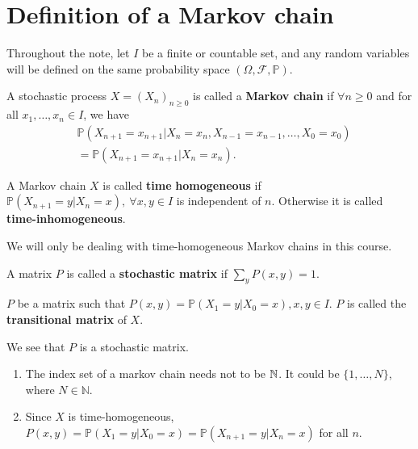 \documentclass[a4paper]{article}
\begin{document}
\maketitle
\clearpage
\tableofcontents
\clearpage 

\section{Definition of a Markov chain}
Throughout the note, let $ I $ be a finite or countable set, and any random variables will be defined on the same probability space $ (\Omega, \mathcal{F}, \mathbb{P}) $.

\begin{definition}
    A stochastic process $ X=(X_n)_{n\ge 0} $ is called a \textbf{Markov chain} if $ \forall n\ge 0 $ and for all $ x_1,\dots,x_n\in I $, we have 
    \[
        \begin{aligned}
            &\mathbb{P}(X_{n+1}=x_{n+1}|X_n=x_n, X_{n-1}=x_{n-1}, \dots, X_0=x_0)\\ &= \mathbb{P}(X_{n+1}=x_{n+1}|X_n=x_n).
        \end{aligned}
    \]
\end{definition}
\begin{definition}
    A Markov chain $X$ is called \textbf{time} \textbf{homogeneous} if $ \mathbb{P}(X_{n+1}=y|X_n=x),\ \forall x,y\in I $ is independent of $n$. Otherwise it is called \textbf{time-inhomogeneous}.
\end{definition}
We will only be dealing with time-homogeneous Markov chains in this course.
\begin{definition}
    A matrix $P$ is called a \textbf{stochastic matrix} if $ \sum_{y}P(x,y)=1 $.
\end{definition}

\begin{definition}
    $P$ be a matrix such that $ P(x,y) = \mathbb{P}(X_1=y|X_0=x), x,y\in I $. $P$ is called the \textbf{transitional matrix} of $X$.
\end{definition}

We see that $P$ is a stochastic matrix.

\begin{remark}
    \begin{enumerate}
        \item The index set of a markov chain needs not to be ${\mathbb{N}}$. It could be $ \{1,\dots,N\} $, where $ N\in \mathbb{N} $.
        \item Since $X$ is time-homogeneous, $ P(x,y)=\mathbb{P}(X_1=y|X_0=x)=\mathbb{P}(X_{n+1}=y|X_n=x) $ for all $n$.
    \end{enumerate}
\end{remark}
\end{document}
